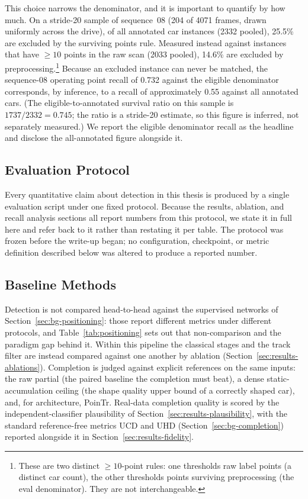 This choice narrows the denominator, and it is important to quantify by how
much. On a stride-20 sample of sequence~08 (204 of \num{4071} frames, drawn
uniformly across the drive), of all annotated car instances
(\num{2332} pooled), 25.5\% are excluded by the surviving points rule.
Measured instead against instances that have $\geq 10$ points in the raw
scan (\num{2033} pooled), 14.6\% are excluded by preprocessing.\footnote{%
These are two distinct $\geq 10$-point rules: one thresholds raw label
points (a distinct car count), the other thresholds points surviving
preprocessing (the eval denominator). They are not interchangeable.}
Because an excluded instance can never be matched, the sequence-08 operating point
recall of \num{0.732} against the eligible denominator corresponds, by inference, to a
recall of approximately \num{0.55} against all annotated cars. (The eligible-to-annotated
survival ratio on this sample is $\num{1737}/\num{2332}=\num{0.745}$; the ratio is a
stride-20 estimate, so this figure is inferred, not separately measured.) We report the eligible denominator
recall as the headline and disclose the all-annotated figure alongside it.

\subsection{Evaluation Protocol}
\label{sec:eval-protocol}

Every quantitative claim about detection in this thesis is produced by a single
evaluation script under one fixed protocol. Because
the results, ablation, and recall analysis sections all report numbers from this
protocol, we state it in full here and refer back to it rather than restating it
per table. The protocol was frozen before the write-up began; no configuration,
checkpoint, or metric definition described below was altered to produce a
reported number.

\subsection{Baseline Methods}
\label{sec:eval-baselines}

Detection is not compared head-to-head against the supervised networks of
Section~\ref{sec:bg-positioning}: those report different metrics under different
protocols, and Table~\ref{tab:positioning} sets out that non-comparison and the
paradigm gap behind it. Within this pipeline the classical stages and the track
filter are instead compared against one another by ablation
(Section~\ref{sec:results-ablations}). Completion is judged against explicit
references on the same inputs: the raw partial (the paired baseline the
completion must beat), a dense static-accumulation ceiling (the shape quality
upper bound of a correctly shaped car), and, for architecture, PoinTr. Real-data
completion quality is scored by the independent-classifier plausibility of
Section~\ref{sec:results-plausibility}, with the standard reference-free metrics UCD and
UHD (Section~\ref{sec:bg-completion}) reported alongside it in
Section~\ref{sec:results-fidelity}.


